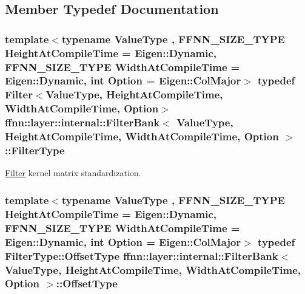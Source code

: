 \subsection{Member Typedef Documentation}
\hypertarget{structffnn_1_1layer_1_1internal_1_1_filter_bank_a3d0c31e34015b7afdd1ee4e34f3344b8}{
\subsubsection[{Filter\-Type}]{\setlength{\rightskip}{0pt plus 5cm}template$<$typename Value\-Type , F\-F\-N\-N\-\_\-\-S\-I\-Z\-E\-\_\-\-T\-Y\-P\-E Height\-At\-Compile\-Time = Eigen\-::\-Dynamic, F\-F\-N\-N\-\_\-\-S\-I\-Z\-E\-\_\-\-T\-Y\-P\-E Width\-At\-Compile\-Time = Eigen\-::\-Dynamic, int Option = Eigen\-::\-Col\-Major$>$ typedef {\bf Filter}$<$Value\-Type, Height\-At\-Compile\-Time, Width\-At\-Compile\-Time, Option$>$ {\bf ffnn\-::layer\-::internal\-::\-Filter\-Bank}$<$ Value\-Type, Height\-At\-Compile\-Time, Width\-At\-Compile\-Time, Option $>$\-::{\bf Filter\-Type}}}\label{structffnn_1_1layer_1_1internal_1_1_filter_bank_a3d0c31e34015b7afdd1ee4e34f3344b8}


\hyperlink{structffnn_1_1layer_1_1internal_1_1_filter}{Filter} kernel matrix standardization. 

\hypertarget{structffnn_1_1layer_1_1internal_1_1_filter_bank_ae6ffb0468f8f6acbfe37505d00935a00}{
\subsubsection[{Offset\-Type}]{\setlength{\rightskip}{0pt plus 5cm}template$<$typename Value\-Type , F\-F\-N\-N\-\_\-\-S\-I\-Z\-E\-\_\-\-T\-Y\-P\-E Height\-At\-Compile\-Time = Eigen\-::\-Dynamic, F\-F\-N\-N\-\_\-\-S\-I\-Z\-E\-\_\-\-T\-Y\-P\-E Width\-At\-Compile\-Time = Eigen\-::\-Dynamic, int Option = Eigen\-::\-Col\-Major$>$ typedef {\bf Filter\-Type\-::\-Offset\-Type} {\bf ffnn\-::layer\-::internal\-::\-Filter\-Bank}$<$ Value\-Type, Height\-At\-Compile\-Time, Width\-At\-Compile\-Time, Option $>$\-::{\bf Offset\-Type}}}\label{structffnn_1_1layer_1_1internal_1_1_filter_bank_ae6ffb0468f8f6acbfe37505d00935a00}


